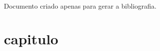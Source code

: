 \documentclass[a4paper,12pt]{article}
\begin{document}
	
Documento criado apenas para gerar a bibliografia.

\section{capitulo}

\nocite{*}


\end{document}
